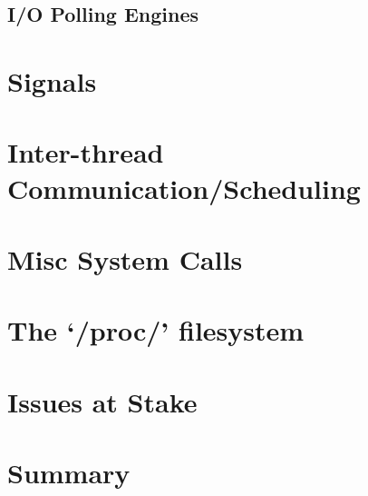 \subsection{I/O Polling Engines}


\section{Signals}

\section{Inter-thread Communication/Scheduling} 

\section{Misc System Calls}

\section{The `/proc/' filesystem}\label{ch3:procfs}








\section{Issues at Stake}
\section {Summary}
